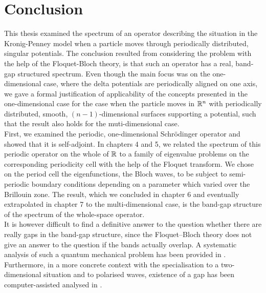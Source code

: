 \chapter{Conclusion} \label{chap:8}
	
This thesis examined the spectrum of an operator describing the situation in the Kronig-Penney model when a particle moves through periodically distributed, singular potentials. The conclusion resulted from considering the problem with the help of the Floquet-Bloch theory, is that such an operator has a real, band-gap structured spectrum. Even though the main focus was on the one-dimensional case, where the delta potentials are periodically aligned on one axis, we gave a formal justification of applicability of the concepts presented in the one-dimensional case for the case when the particle moves in $\mathbb{R}^{n}$ with periodically distributed, smooth, $(n-1)$-dimensional surfaces supporting a potential, such that the result also holds for the muti-dimensional case. 
~\\

First, we examined the periodic, one-dimensional Schrödinger operator and showed that it is self-adjoint. In chapters 4 and 5, we related the spectrum of this periodic operator on the whole of $\mathbb{R}$ to a family of eigenvalue problems on the corresponding periodicity cell with the help of the Floquet transform. We chose on the period cell the eigenfunctions, the Bloch waves, to be subject to semi-periodic boundary conditions depending on a parameter which varied over the Brillouin zone. The result, which we concluded in chapter 6 and eventually extrapolated in chapter 7 to the multi-dimensional case, is the band-gap structure of the spectrum of the whole-space operator.
~\\

It is however difficult to find a definitive answer to the question whether there are really gaps in the band-gap structure, since the Floquet–Bloch theory does not give an answer to the question if the bands actually overlap. A systematic analysis of such a quantum mechanical problem has been provided in \cite{albeverio2012solvable}. Furthermore, in a more concrete context with the specialisation to a two-dimensional situation and to polarised waves, existence of a gap has been computer-assisted analysed in \cite{hoang2009computer}. 
~\\

